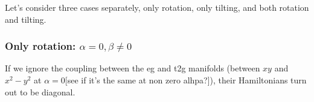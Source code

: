 \documentclass[a4paper,prb]{revtex4-1}  %
\begin{document}
Let's consider three cases separately, only rotation, only tilting, and both rotation and tilting.

\subsubsection{Only rotation: $\alpha=0,\beta\neq 0$}
If we ignore the coupling between the eg and t2g manifolds (between $xy$ and $x^2-y^2$ at $\alpha=0$[see if it's the same at non zero alhpa?]),
their Hamiltonians turn out to be diagonal.

\end{document}
